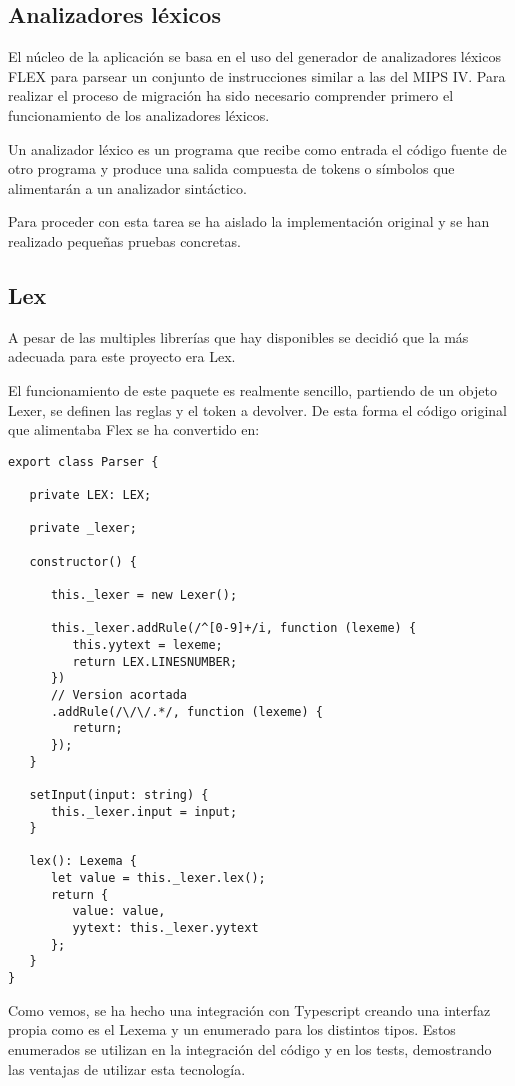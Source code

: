\subsection{Analizadores léxicos}
El núcleo de la aplicación se basa en el uso del generador de analizadores 
léxicos FLEX para parsear un conjunto de instrucciones similar a las del MIPS IV. 
Para realizar el proceso de migración ha sido necesario comprender primero el 
funcionamiento de los analizadores léxicos.

\bigskip
Un analizador léxico es un programa que recibe como entrada el código fuente de 
otro programa y produce una salida compuesta de tokens o símbolos 
que alimentarán a un analizador sintáctico.

\bigskip
Para proceder con esta tarea se ha aislado la implementación original y se han 
realizado pequeñas pruebas concretas.

\subsection{Lex}

A pesar de las multiples librerías que hay disponibles se decidió que la más adecuada 
para este proyecto era Lex\cite{Lex}. 

El funcionamiento de este paquete es realmente sencillo, partiendo de un 
objeto Lexer, se definen las reglas y el token a devolver. De esta forma
el código original que alimentaba Flex se ha convertido en: 

\begin{lstlisting}
export class Parser {

   private LEX: LEX;

   private _lexer;

   constructor() {

      this._lexer = new Lexer();

      this._lexer.addRule(/^[0-9]+/i, function (lexeme) {
         this.yytext = lexeme;
         return LEX.LINESNUMBER;
      })
      // Version acortada
      .addRule(/\/\/.*/, function (lexeme) {
         return;
      });
   }

   setInput(input: string) {
      this._lexer.input = input;
   }

   lex(): Lexema {
      let value = this._lexer.lex();
      return {
         value: value,
         yytext: this._lexer.yytext
      };
   }
}
\end{lstlisting}

Como vemos, se ha hecho una integración con Typescript creando una interfaz propia como es 
el Lexema y un enumerado para los distintos tipos. Estos enumerados se utilizan en la integración 
del código y en los tests, demostrando las ventajas de utilizar esta tecnología.
